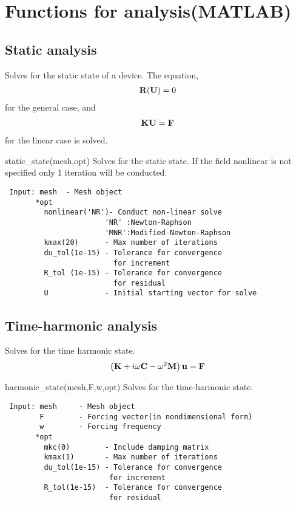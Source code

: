 \clearpage
\section{Functions for analysis(MATLAB)}
\subsection{Static analysis}
  Solves for the static state of a device. The equation,
\begin{eqnarray}
  \mathbf{R}(\mathbf{U}) = 0
\end{eqnarray}
  for the general case, and 
\begin{eqnarray}
\mathbf{K}\mathbf{U} = \mathbf{F}
\end{eqnarray}
  for the linear case is solved. 

\begin{codelist}

  \item[static\_state(mesh,opt)]
  Solves for the static state. If the field nonlinear is 
  not specified only 1 iteration will be conducted.
\begin{verbatim}
 Input: mesh  - Mesh object
       *opt
         nonlinear('NR')- Conduct non-linear solve
                       'NR' :Newton-Raphson
                       'MNR':Modified-Newton-Raphson
         kmax(20)      - Max number of iterations
         du_tol(1e-15) - Tolerance for convergence
                         for increment
         R_tol (1e-15) - Tolerance for convergence
                         for residual
         U             - Initial starting vector for solve
\end{verbatim}

\end{codelist}

\subsection{Time-harmonic analysis}
Solves for the time harmonic state.
\begin{eqnarray}
\left(\mathbf{K} + i\omega \mathbf{C} - \omega^2\mathbf{M}\right)\mathbf{u} = \mathbf{F}
\end{eqnarray}

\begin{codelist}

 \item[harmonic\_state(mesh,F,w,opt)]
 Solves for the time-harmonic state.
\begin{verbatim}
 Input: mesh     - Mesh object
        F        - Forcing vector(in nondimensional form)
        w        - Forcing frequency
       *opt
         mkc(0)        - Include damping matrix
         kmax(1)       - Max number of iterations
         du_tol(1e-15) - Tolerance for convergence
                        for increment
         R_tol(1e-15)  - Tolerance for convergence
                        for residual
\end{verbatim}

\end{codelist}

